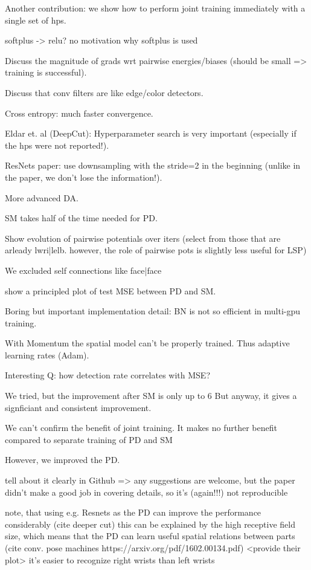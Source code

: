 \documentclass[a4paper,11pt]{article}
\begin{document}
    Another contribution: we show how to perform joint training immediately with a single set of hps.

    softplus -> relu? no motivation why softplus is used

    Discuss the magnitude of grads wrt pairwise energies/biases (should be small => training is successful).

    Discuss that conv filters are like edge/color detectors.

    Cross entropy: much faster convergence.

    Eldar et. al (DeepCut): Hyperparameter search is very important (especially if the hps were not reported!).

    ResNets paper: use downsampling with the stride=2 in the beginning (unlike in the paper, we don't lose the information!).

    More advanced DA.

    SM takes half of the time needed for PD.

    Show evolution of pairwise potentials over iters (select from those that are arleady lwri|lelb. however, the role of
    pairwise pots is slightly less useful for LSP)


    We excluded self connections like face|face

    show a principled plot of test MSE between PD and SM.

    Boring but important implementation detail: BN is not so efficient in multi-gpu training.

    With Momentum the spatial model can't be properly trained. Thus adaptive learning rates (Adam).

    Interesting Q: how detection rate correlates with MSE?



    We tried, but the improvement after SM is only up to 6%
    But anyway, it gives a signficiant and consistent improvement.

    We can't confirm the benefit of joint training. It makes no further benefit compared to
    separate training of PD and SM

    However, we improved the PD.

    tell about it clearly in Github => any suggestions are welcome, but the paper didn't make a good
    job in covering details, so it's (again!!!) not reproducible

    note, that using e.g. Resnets as the PD can improve the performance considerably (cite deeper cut)
    this can be explained by the high receptive field size, which means that the PD can
    learn useful spatial relations between parts (cite conv. pose machines https://arxiv.org/pdf/1602.00134.pdf)
    <provide their plot>
    it's easier to recognize right wrists than left wrists
\end{document}
